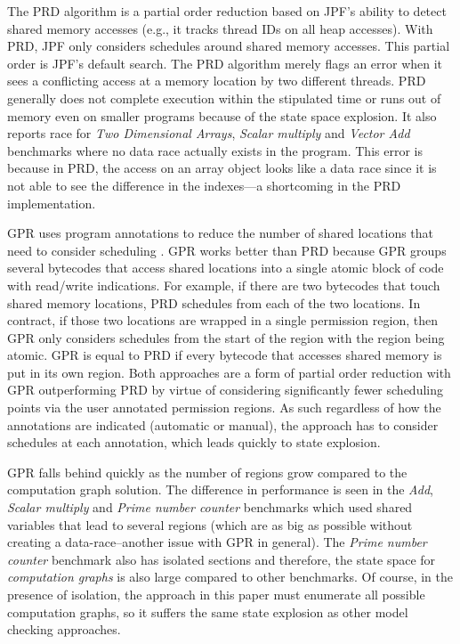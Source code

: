 The PRD algorithm is a partial order reduction based on JPF's ability to detect shared memory accesses (e.g., it tracks thread IDs on all heap accesses). With PRD, JPF only considers schedules around shared memory accesses. This partial order is JPF's default search. The PRD algorithm merely flags an error when it sees a conflicting access at a memory location by two different threads.  PRD generally does not complete execution within the stipulated time or runs out of memory even on smaller programs because of the state space explosion. It also reports race for \textit{Two Dimensional Arrays}, \textit{Scalar multiply} and \textit{Vector Add} benchmarks where no data race actually exists in the program. This error is because in PRD, the access on an array object looks like a data race since it is not able to see the difference in the indexes---a shortcoming in the PRD implementation.

GPR uses program annotations to reduce the number of shared locations that need to consider scheduling \cite{mercer2015model}. GPR works better than PRD because GPR groups several bytecodes that access shared locations into a single atomic block of code with read/write indications. For example, if there are two bytecodes that touch shared memory locations, PRD schedules from each of the two locations. In contract, if those two locations are wrapped in a single permission region, then GPR only considers schedules from the start of the region with the region being atomic. GPR is equal to PRD if every bytecode that accesses shared memory is put in its own region.  Both approaches are a form of partial order reduction with GPR outperforming PRD by virtue of considering significantly fewer scheduling points via the user annotated permission regions. As such regardless of how the annotations are indicated (automatic or manual), the approach has to consider schedules at each annotation, which leads quickly to state explosion.

GPR falls behind quickly as the number of regions grow compared to the computation graph solution. The difference in performance is seen in the \textit{Add}, \textit{Scalar multiply} and \textit{Prime number counter} benchmarks which used shared variables that lead to several regions (which are as big as possible without creating a data-race--another issue with GPR in general).  The \textit{Prime number counter} benchmark also has isolated sections and therefore, the state space for \textit{computation graphs} is also large compared to other benchmarks. Of course, in the presence of isolation, the approach in this paper must enumerate all possible computation graphs, so it suffers the same state explosion as other model checking approaches.

